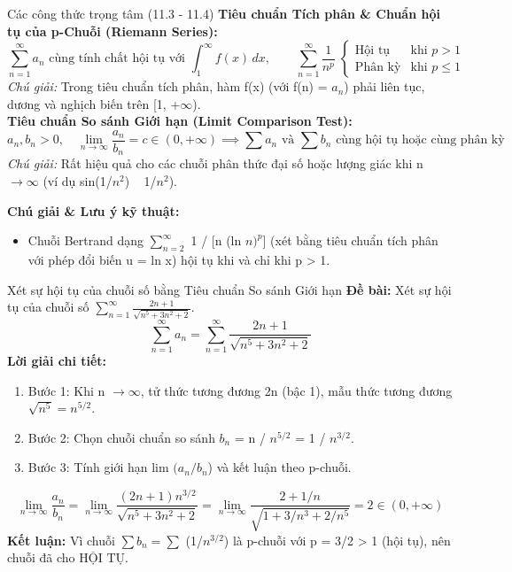\documentclass[11pt,a4paper,oneside]{book}
\begin{document}
\begin{congthuc}{Các công thức trọng tâm (11.3 - 11.4)}
\noindent\textbf{Tiêu chuẩn Tích phân \& Chuẩn hội tụ của p-Chuỗi (Riemann Series):}
\[ \sum_{n=1}^\infty a_n \text{ cùng tính chất hội tụ với } \int_1^\infty f(x)\,dx, \qquad \sum_{n=1}^\infty \frac{1}{n^p} \;\begin{cases} \text{Hội tụ} & \text{khi } p > 1 \\ \text{Phân kỳ} & \text{khi } p \le 1 \end{cases} \]
\noindent\textit{Chú giải:} Trong tiêu chuẩn tích phân, hàm f(x) (với f(n) = $a_n$) phải liên tục, dương và nghịch biến trên [1, +$\infty$).\\[4pt]
\noindent\textbf{Tiêu chuẩn So sánh Giới hạn (Limit Comparison Test):}
\[ a_n, b_n > 0, \quad \lim_{n \to \infty} \frac{a_n}{b_n} = c \in (0, +\infty) \implies \sum a_n \text{ và } \sum b_n \text{ cùng hội tụ hoặc cùng phân kỳ} \]
\noindent\textit{Chú giải:} Rất hiệu quả cho các chuỗi phân thức đại số hoặc lượng giác khi n $\to \infty$ (ví dụ sin(1/$n^2$) ~ 1/$n^2$).\\[4pt]
\end{congthuc}

\noindent\textbf{Chú giải \& Lưu ý kỹ thuật:}
\begin{itemize}[leftmargin=1.5em, itemsep=2pt]
  \item Chuỗi Bertrand dạng $\sum_{n=2}^\infty$ 1 / [n (ln $n)^p$] (xét bằng tiêu chuẩn tích phân với phép đổi biến u = ln x) hội tụ khi và chỉ khi p > 1.
\end{itemize}

\begin{vidu}{Xét sự hội tụ của chuỗi số bằng Tiêu chuẩn So sánh Giới hạn}
\textbf{Đề bài:} Xét sự hội tụ của chuỗi số $\sum_{n=1}^\infty \frac{2n + 1}{\sqrt{n^5 + 3n^2 + 2}}$.
\[ \sum_{n=1}^\infty a_n = \sum_{n=1}^\infty \frac{2n + 1}{\sqrt{n^5 + 3n^2 + 2}} \]
\textbf{Lời giải chi tiết:}
\begin{enumerate}[leftmargin=1.5em, itemsep=2pt]
  \item Bước 1: Khi n $\to \infty$, tử thức tương đương 2n (bậc 1), mẫu thức tương đương $\sqrt{n^5} = n^{5/2}$.
  \item Bước 2: Chọn chuỗi chuẩn so sánh $b_n$ = n / $n^{5/2}$ = 1 / $n^{3/2}$.
  \item Bước 3: Tính giới hạn lim $(a_n / b_n$) và kết luận theo p-chuỗi.
\end{enumerate}
\[ \lim_{n \to \infty} \frac{a_n}{b_n} = \lim_{n \to \infty} \frac{(2n + 1)n^{3/2}}{\sqrt{n^5 + 3n^2 + 2}} = \lim_{n \to \infty} \frac{2 + 1/n}{\sqrt{1 + 3/n^3 + 2/n^5}} = 2 \in (0, +\infty) \]
\noindent\textbf{Kết luận:} Vì chuỗi $\sum b_n = \sum$ (1/$n^{3/2}$) là p-chuỗi với p = 3/2 > 1 (hội tụ), nên chuỗi đã cho HỘI TỤ.
\end{vidu}
\end{document}
